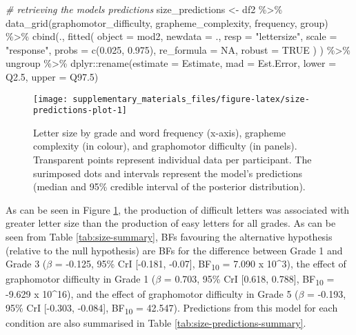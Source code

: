 \documentclass[
  11pt,
  english,
  ,doc,mask,floatsintext]{apa6}
\newenvironment{Shaded}{}{}
\newcommand{\AttributeTok}[1]{\textcolor[rgb]{0.49,0.56,0.16}{#1}}
\newcommand{\CommentTok}[1]{\textcolor[rgb]{0.38,0.63,0.69}{\textit{#1}}}
\newcommand{\ConstantTok}[1]{\textcolor[rgb]{0.53,0.00,0.00}{#1}}
\newcommand{\FloatTok}[1]{\textcolor[rgb]{0.25,0.63,0.44}{#1}}
\newcommand{\FunctionTok}[1]{\textcolor[rgb]{0.02,0.16,0.49}{#1}}
\newcommand{\NormalTok}[1]{#1}
\newcommand{\OtherTok}[1]{\textcolor[rgb]{0.00,0.44,0.13}{#1}}
\newcommand{\SpecialCharTok}[1]{\textcolor[rgb]{0.25,0.44,0.63}{#1}}
\newcommand{\StringTok}[1]{\textcolor[rgb]{0.25,0.44,0.63}{#1}}
\begin{document}
\begin{Shaded}
\begin{Highlighting}[]
\CommentTok{\# retrieving the model\textquotesingle{}s predictions}
\NormalTok{size\_predictions }\OtherTok{\textless{}{-}}\NormalTok{ df2 }\SpecialCharTok{\%\textgreater{}\%}
    \FunctionTok{data\_grid}\NormalTok{(graphomotor\_difficulty, grapheme\_complexity, frequency, group) }\SpecialCharTok{\%\textgreater{}\%}
    \FunctionTok{cbind}\NormalTok{(., }\FunctionTok{fitted}\NormalTok{(}
        \AttributeTok{object =}\NormalTok{ mod2, }\AttributeTok{newdata =}\NormalTok{ ., }\AttributeTok{resp =} \StringTok{"lettersize"}\NormalTok{,}
        \AttributeTok{scale =} \StringTok{"response"}\NormalTok{, }\AttributeTok{probs =} \FunctionTok{c}\NormalTok{(}\FloatTok{0.025}\NormalTok{, }\FloatTok{0.975}\NormalTok{),}
        \AttributeTok{re\_formula =} \ConstantTok{NA}\NormalTok{, }\AttributeTok{robust =} \ConstantTok{TRUE}
\NormalTok{        ) ) }\SpecialCharTok{\%\textgreater{}\%}
\NormalTok{    ungroup }\SpecialCharTok{\%\textgreater{}\%}
\NormalTok{    dplyr}\SpecialCharTok{::}\FunctionTok{rename}\NormalTok{(}\AttributeTok{estimate =}\NormalTok{ Estimate, }\AttributeTok{mad =}\NormalTok{ Est.Error, }\AttributeTok{lower =}\NormalTok{ Q2}\FloatTok{.5}\NormalTok{, }\AttributeTok{upper =}\NormalTok{ Q97}\FloatTok{.5}\NormalTok{)}
\end{Highlighting}
\end{Shaded}

\begin{figure}[!htb]

{\centering \texttt{[image: supplementary\_materials\_files/figure-latex/size-predictions-plot-1]} 

}

\caption{Letter size by grade and word frequency (x-axis), grapheme complexity (in colour), and graphomotor difficulty (in panels). Transparent points represent individual data per participant. The surimposed dots and intervals represent the model's predictions (median and 95\% credible interval of the posterior distribution).}\label{fig:size-predictions-plot}
\end{figure}

As can be seen in Figure \ref{fig:size-predictions-plot}, the production of difficult letters was associated with greater letter size than the production of easy letters for all grades. As can be seen from Table \ref{tab:size-summary}, BFs favouring the alternative hypothesis (relative to the null hypothesis) are BFs for the difference between Grade 1 and Grade 3 (\(\beta\) = -0.125, 95\% CrI {[}-0.181, -0.07{]}, BF\textsubscript{10} = 7.090 x 10\^{}3), the effect of graphomotor difficulty in Grade 1 (\(\beta\) = 0.703, 95\% CrI {[}0.618, 0.788{]}, BF\textsubscript{10} = -9.629 x 10\^{}16), and the effect of graphomotor difficulty in Grade 5 (\(\beta\) = -0.193, 95\% CrI {[}-0.303, -0.084{]}, BF\textsubscript{10} = 42.547). Predictions from this model for each condition are also summarised in Table \ref{tab:size-predictions-summary}.
\end{document}
